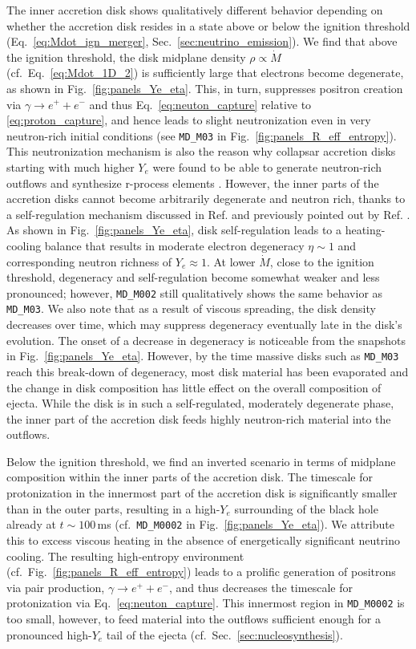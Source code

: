 The inner accretion disk shows qualitatively different behavior depending on whether the accretion disk resides in a state above or below the ignition threshold (Eq.~\eqref{eq:Mdot_ign_merger}, Sec.~\ref{sec:neutrino_emission}). We find that above the ignition threshold, the disk midplane density $\rho\propto \dot{M}$ (cf.~Eq.~\eqref{eq:Mdot_1D_2}) is sufficiently large that electrons become degenerate, as shown in Fig.~\ref{fig:panels_Ye_eta}. This, in turn, suppresses positron creation via $\gamma\rightarrow e^+ + e^-$ and thus Eq.~\eqref{eq:neuton_capture} relative to \eqref{eq:proton_capture}, and hence leads to slight neutronization even in very neutron-rich initial conditions (see \texttt{MD\_M03} in Fig.~\ref{fig:panels_R_eff_entropy}). This neutronization mechanism is also the reason why collapsar accretion disks starting with much higher $Y_e$ were found to be able to generate neutron-rich outflows and synthesize r-process elements \cite{siegel_collapsars_2019}. However, the inner parts of the accretion disks cannot become arbitrarily degenerate and neutron rich, thanks to a self-regulation mechanism discussed in Ref. \cite{Siegel:2017jug} and previously pointed out by Ref. \cite{chen_neutrino-cooled_2007}. As shown in Fig.~\ref{fig:panels_Ye_eta}, disk self-regulation leads to a heating-cooling balance that results in moderate electron degeneracy $\eta\sim 1$ and corresponding neutron richness of $Y_e\approx 1$. At lower $\dot{M}$, close to the ignition threshold, degeneracy and self-regulation become somewhat weaker and less pronounced; however, \texttt{MD\_M002} still qualitatively shows the same behavior as \texttt{MD\_M03}. We also note that as a result of viscous spreading, the disk density decreases over time, which may suppress degeneracy eventually late in the disk's evolution. The onset of a decrease in degeneracy is noticeable from the snapshots in Fig.~\ref{fig:panels_Ye_eta}. However, by the time massive disks such as \texttt{MD\_M03} reach this break-down of degeneracy, most disk material has been evaporated and the change in disk composition has little effect on the overall composition of ejecta. While the disk is in such a self-regulated, moderately degenerate phase, the inner part of the accretion disk feeds highly neutron-rich material into the outflows.

Below the ignition threshold, we find an inverted scenario in terms of midplane composition within the inner parts of the accretion disk. The timescale for protonization in the innermost part of the accretion disk is significantly smaller than in the outer parts, resulting in a high-$Y_e$ surrounding of the black hole already at $t\sim100$\,ms (cf.~\texttt{MD\_M0002} in Fig.~\ref{fig:panels_Ye_eta}). We attribute this to excess viscous heating in the absence of energetically significant neutrino cooling. The resulting high-entropy environment (cf.~Fig.~\ref{fig:panels_R_eff_entropy}) leads to a prolific generation of positrons via pair production, $\gamma\rightarrow e^+ + e^-$, and thus decreases the timescale for protonization via Eq.~\eqref{eq:neuton_capture}. This innermost region in \texttt{MD\_M0002} is too small, however, to feed material into the outflows sufficient enough for a pronounced high-$Y_e$ tail of the ejecta (cf.~Sec.~\ref{sec:nucleosynthesis}).


